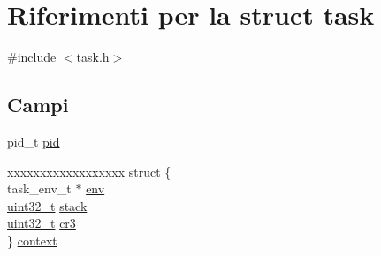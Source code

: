 \hypertarget{structtask}{\section{Riferimenti per la struct task}
\label{structtask}
}


{\ttfamily \#include $<$task.\+h$>$}

\subsection*{Campi}
\begin{DoxyCompactItemize}
\item 
pid\+\_\+t \hyperlink{structtask_ab56448ae42a75825ea923bd86648f3ae}{pid}
\item 
\begin{tabbing}
xx\=xx\=xx\=xx\=xx\=xx\=xx\=xx\=xx\=\kill
struct \{\\
\>task\_env\_t $\ast$ \hyperlink{structtask_a8dbbb79f7c29771d36f1d98ec84cbbdf}{env}\\
\>\hyperlink{aplus_8h_a53a0df51603c77c2aa5b9ea61b606a82}{uint32\_t} \hyperlink{structtask_a71232ebd31259f41c057b3e789b44587}{stack}\\
\>\hyperlink{aplus_8h_a53a0df51603c77c2aa5b9ea61b606a82}{uint32\_t} \hyperlink{structtask_a5f4968459d4640f19c7e802ae7057179}{cr3}\\
\} \hyperlink{structtask_a7e47fc3627188eeefc77f78e8d36ddd1}{context}\\


\end{tabbing}
\end{DoxyCompactItemize}
